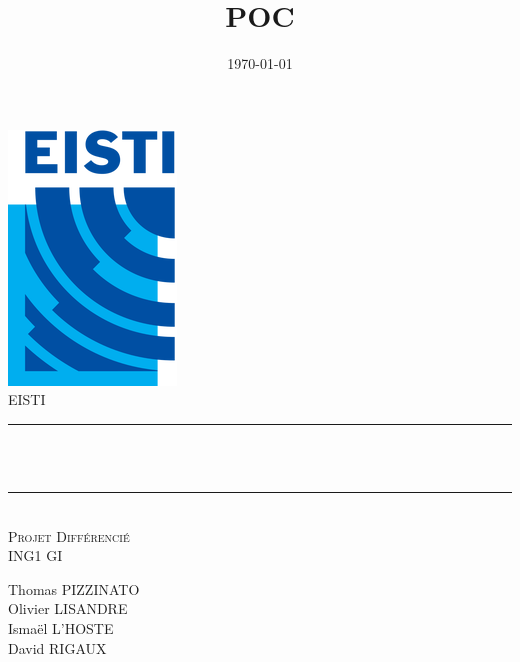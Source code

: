 \documentclass[12pt]{article}
\title{POC}								%
\author{}								%
\date{\today}											%
\makeatletter
\let\thetitle\@title
\let\thedate\@date
\makeatother
\begin{document}

\begin{titlepage}
	\centering
    \vspace*{0.5 cm}
    \includegraphics[scale = 0.75 ]{logo1.png}\\[1.0 cm]	%
    \textsc{\LARGE EISTI}\\[2.0 cm]			%
    \rule{\linewidth}{0.2 mm} \\[0.5 cm]
    { \huge \bfseries \thetitle}\\
    \rule{\linewidth}{0.2 mm} \\[1.5 cm]
	\textsc{\Large Projet Différencié}\\[0.5 cm]	%
	\textsc{\large ING1 GI}\\[0.5 cm]		%
	
	\begin{minipage}{0.4\textwidth}
	\centering
		\begin{center} \large
		Thomas PIZZINATO \\
		Olivier LISANDRE \\
		Ismaël L'HOSTE \\
		David RIGAUX \\
			\end{center}
			\end{minipage}~
			\begin{minipage}{0.4\textwidth}
	\end{minipage}\\[0.8 cm]
	{\large \thedate}\\[1 cm]
	\vfill
	
\end{titlepage}

\end{document}
